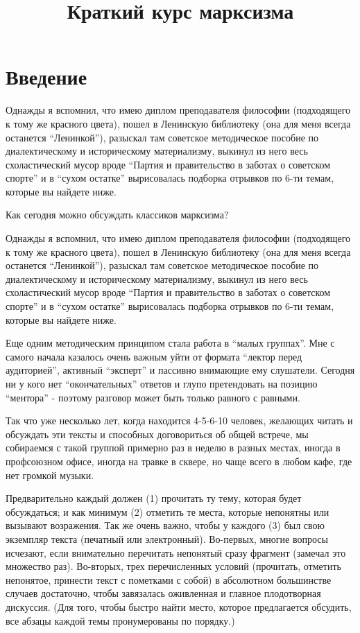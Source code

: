 \documentclass[12pt]{article}
\date{}
\title{%
  Краткий курс марксизма \\
  \large}
\begin{document}
\maketitle

\tableofcontents

\newpage

\section*{Введение}
\label{sec:intro}


Однажды я вспомнил, что имею диплом преподавателя философии (подходящего к тому же красного цвета), пошел в Ленинскую библиотеку (она для меня всегда останется “Ленинкой”), разыскал там советское методическое пособие по диалектическому и историческому материализму, выкинул из него весь схоластический мусор вроде “Партия и правительство в заботах о советском спорте” и в “сухом остатке” вырисовалась подборка отрывков по 6-ти темам, которые вы найдете ниже.

Как сегодня можно обсуждать классиков марксизма?

Однажды я вспомнил, что имею диплом преподавателя философии (подходящего к тому же красного цвета), пошел в Ленинскую библиотеку (она для меня всегда останется “Ленинкой”), разыскал там советское методическое пособие по диалектическому и историческому материализму, выкинул из него весь схоластический мусор вроде “Партия и правительство в заботах о советском спорте” и в “сухом остатке” вырисовалась подборка отрывков по 6-ти темам, которые вы найдете ниже.

Еще одним методическим принципом стала работа в “малых группах”. Мне с самого начала казалось очень важным уйти от формата “лектор перед аудиторией”, активный “эксперт” и пассивно внимающие ему слушатели. Сегодня ни у кого нет “окончательных” ответов и глупо претендовать на позицию “ментора” - поэтому разговор может быть только равного с равными.

Так что уже несколько лет, когда находится 4-5-6-10 человек, желающих читать и обсуждать эти тексты и способных договориться об общей встрече, мы собираемся с такой группой примерно раз в неделю в разных местах, иногда в профсоюзном офисе, иногда на травке в сквере, но чаще всего в любом кафе, где нет громкой музыки.

Предварительно каждый должен (1) прочитать ту тему, которая будет обсуждаться; и как минимум (2) отметить те места, которые непонятны или вызывают возражения. Так же очень важно, чтобы у каждого (3) был свою экземпляр текста (печатный или электронный). Во-первых, многие вопросы исчезают, если внимательно перечитать непонятый сразу фрагмент (замечал это множество раз). Во-вторых, трех перечисленных условий (прочитать, отметить непонятое, принести текст с пометками с собой) в абсолютном большинстве случаев достаточно, чтобы завязалась оживленная и главное плодотворная дискуссия. (Для того, чтобы быстро найти место, которое предлагается обсудить, все абзацы каждой темы пронумерованы по порядку.)
\end{document}
